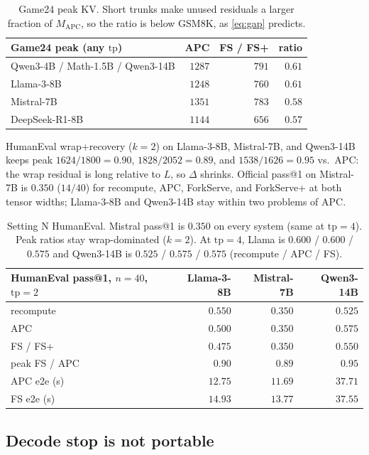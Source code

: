 \documentclass[11pt,a4paper]{article}
\begin{document}
\begin{table}[h]
\centering
\small
\begin{tabular}{@{}lrrr@{}}
\toprule
Game24 peak (any $\mathrm{tp}$) & APC & FS / FS+ & ratio \\
\midrule
Qwen3-4B / Math-1.5B / Qwen3-14B & $1287$ & $791$ & $0.61$ \\
Llama-3-8B & $1248$ & $760$ & $0.61$ \\
Mistral-7B & $1351$ & $783$ & $0.58$ \\
DeepSeek-R1-8B & $1144$ & $656$ & $0.57$ \\
\bottomrule
\end{tabular}
\caption{Game24 peak KV.
Short trunks make unused residuals a larger fraction of $M_{\mathrm{APC}}$, so the ratio is below GSM8K, as \eqref{eq:gap} predicts.}
\end{table}

HumanEval wrap+recovery ($k{=}2$) on Llama-3-8B, Mistral-7B, and Qwen3-14B keeps peak $1624/1800{=}0.90$, $1828/2052{=}0.89$, and $1538/1626{=}0.95$ vs.\ APC: the wrap residual is long relative to $L$, so $\Delta$ shrinks.
Official pass@1 on Mistral-7B is $0.350$ ($14/40$) for recompute, APC, ForkServe, and ForkServe+ at both tensor widths; Llama-3-8B and Qwen3-14B stay within two problems of APC.

\begin{table}[h]
\centering
\small
\begin{tabular}{@{}lrrr@{}}
\toprule
HumanEval pass@1, $n{=}40$, $\mathrm{tp}{=}2$ & Llama-3-8B & Mistral-7B & Qwen3-14B \\
\midrule
recompute & $0.550$ & $0.350$ & $0.525$ \\
APC & $0.500$ & $0.350$ & $0.575$ \\
FS / FS+ & $0.475$ & $0.350$ & $0.550$ \\
peak FS / APC & $0.90$ & $0.89$ & $0.95$ \\
APC e2e (s) & $12.75$ & $11.69$ & $37.71$ \\
FS e2e (s) & $14.93$ & $13.77$ & $37.55$ \\
\bottomrule
\end{tabular}
\caption{Setting N HumanEval.
Mistral pass@1 is $0.350$ on every system (same at $\mathrm{tp}{=}4$).
Peak ratios stay wrap-dominated ($k{=}2$).
At $\mathrm{tp}{=}4$, Llama is $0.600$ / $0.600$ / $0.575$ and Qwen3-14B is $0.525$ / $0.575$ / $0.575$ (recompute / APC / FS).}
\end{table}

\subsection{Decode stop is not portable}
\end{document}

